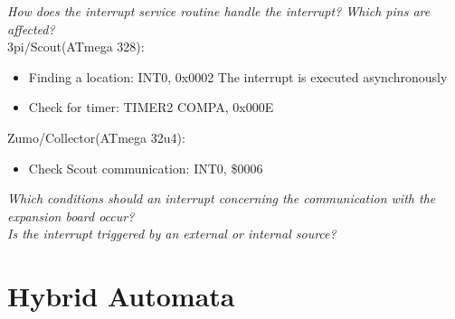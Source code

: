 \documentclass[12pt]{article}
\begin{document}
\flushleft
\textit{How does the interrupt service routine handle the interrupt? Which pins are affected?} \\

3pi/Scout(ATmega 328): \\
\begin{itemize}
\item Finding a location: INT0, 0x0002
The interrupt is executed asynchronously 
\item Check for timer: TIMER2 COMPA, 0x000E 
\end{itemize}
Zumo/Collector(ATmega 32u4): \\
\begin{itemize}
\item Check Scout communication: INT0, \$0006
\end{itemize}

\textit{Which conditions should an interrupt concerning the communication with the expansion board occur?} \\
\textit{Is the interrupt triggered by an external or internal source?} \\


\newpage
\section*{Hybrid Automata}
\end{document}
